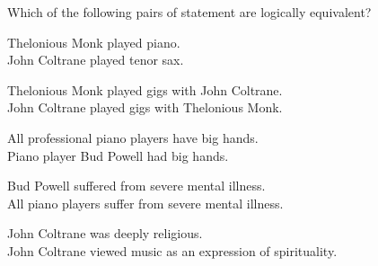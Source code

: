 \noindent \problempart Which of the following pairs of statement are logically equivalent? 

\begin{exercises}
\item  Thelonious Monk played piano.	\\
	John Coltrane played tenor sax. 
\item  Thelonious Monk played gigs with John Coltrane.	\\
	John Coltrane played gigs with Thelonious Monk.
\item  All professional piano players have big hands.	\\
	Piano player Bud Powell had big hands.
\item  Bud Powell suffered from severe mental illness.	 \\
	All piano players suffer from severe mental illness.
\item John Coltrane was deeply religious.	 \\
John Coltrane viewed music as an expression of spirituality. 
\end{exercises}


